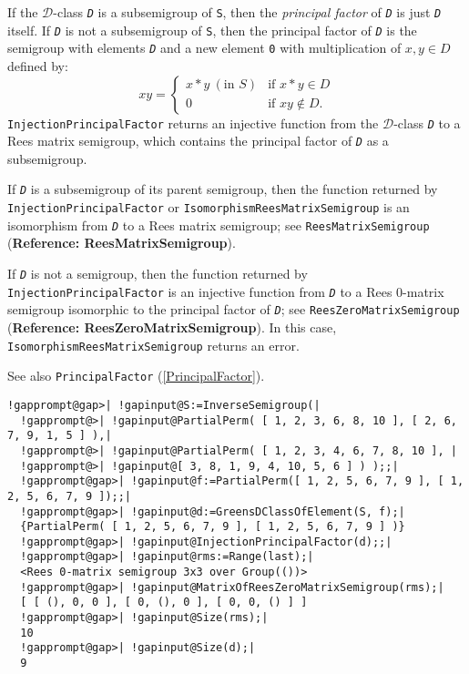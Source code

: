 \documentclass[a4paper,11pt]{report}
\begin{document}
{{{ If the $\mathcal{D}$-class \mbox{\texttt{\mdseries\slshape D}} is a subsemigroup of \texttt{S}, then the \emph{principal factor} of \mbox{\texttt{\mdseries\slshape D}} is just \mbox{\texttt{\mdseries\slshape D}} itself. If \mbox{\texttt{\mdseries\slshape D}} is not a subsemigroup of \texttt{S}, then the principal factor of \mbox{\texttt{\mdseries\slshape D}} is the semigroup with elements \mbox{\texttt{\mdseries\slshape D}} and a new element \texttt{0} with multiplication of $x,y\in D$ defined by:  
\[ xy=\left\{\begin{array}{ll} x*y\ (\textrm{in }S)&\textrm{if }x*y\in D\\
0&\textrm{if }xy\not\in D. \end{array}\right. \]
   \texttt{InjectionPrincipalFactor} returns an injective function from the $\mathcal{D}$-class \mbox{\texttt{\mdseries\slshape D}} to a Rees matrix semigroup, which contains the principal factor of \mbox{\texttt{\mdseries\slshape D}} as a subsemigroup. 

 If \mbox{\texttt{\mdseries\slshape D}} is a subsemigroup of its parent semigroup, then the function returned by \texttt{InjectionPrincipalFactor} or \texttt{IsomorphismReesMatrixSemigroup} is an isomorphism from \mbox{\texttt{\mdseries\slshape D}} to a Rees matrix semigroup; see \texttt{ReesMatrixSemigroup} (\textbf{Reference: ReesMatrixSemigroup}).

 If \mbox{\texttt{\mdseries\slshape D}} is not a semigroup, then the function returned by \texttt{InjectionPrincipalFactor} is an injective function from \mbox{\texttt{\mdseries\slshape D}} to a Rees 0-matrix semigroup isomorphic to the principal factor of \mbox{\texttt{\mdseries\slshape D}}; see \texttt{ReesZeroMatrixSemigroup} (\textbf{Reference: ReesZeroMatrixSemigroup}). In this case, \texttt{IsomorphismReesMatrixSemigroup} returns an error.

 See also \texttt{PrincipalFactor} (\ref{PrincipalFactor}). 
\begin{Verbatim}[commandchars=!@|,fontsize=\small,frame=single,label=Example]
  !gapprompt@gap>| !gapinput@S:=InverseSemigroup(|
  !gapprompt@>| !gapinput@PartialPerm( [ 1, 2, 3, 6, 8, 10 ], [ 2, 6, 7, 9, 1, 5 ] ),|
  !gapprompt@>| !gapinput@PartialPerm( [ 1, 2, 3, 4, 6, 7, 8, 10 ], |
  !gapprompt@>| !gapinput@[ 3, 8, 1, 9, 4, 10, 5, 6 ] ) );;|
  !gapprompt@gap>| !gapinput@f:=PartialPerm([ 1, 2, 5, 6, 7, 9 ], [ 1, 2, 5, 6, 7, 9 ]);;|
  !gapprompt@gap>| !gapinput@d:=GreensDClassOfElement(S, f);|
  {PartialPerm( [ 1, 2, 5, 6, 7, 9 ], [ 1, 2, 5, 6, 7, 9 ] )}
  !gapprompt@gap>| !gapinput@InjectionPrincipalFactor(d);;|
  !gapprompt@gap>| !gapinput@rms:=Range(last);|
  <Rees 0-matrix semigroup 3x3 over Group(())>
  !gapprompt@gap>| !gapinput@MatrixOfReesZeroMatrixSemigroup(rms);|
  [ [ (), 0, 0 ], [ 0, (), 0 ], [ 0, 0, () ] ]
  !gapprompt@gap>| !gapinput@Size(rms);|
  10
  !gapprompt@gap>| !gapinput@Size(d);|
  9
\end{Verbatim}
 }

}}
\end{document}
